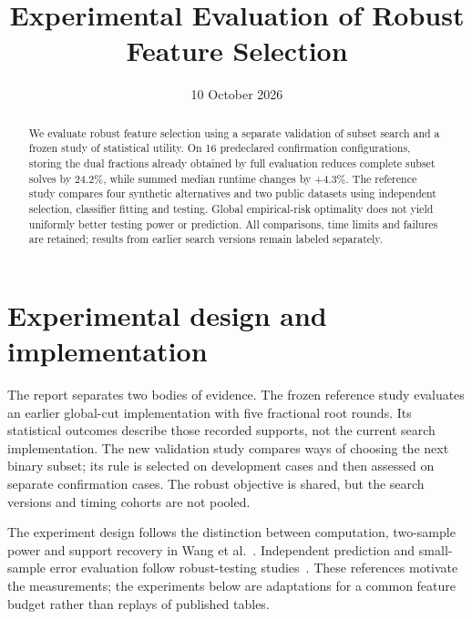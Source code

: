\documentclass[11pt,a4paper]{article}
\title{Experimental Evaluation of Robust Feature Selection}
\author{}
\date{10 October 2026}
\makeatletter
\renewcommand{\maketitle}{\begin{center}{\Large\bfseries\@title\par}\vspace{4pt}
{\small\@date\par}\end{center}\vspace{2pt}}
\makeatother
\begin{document}
\maketitle
\begin{abstract}
We evaluate robust feature selection using a separate validation of subset search and a frozen study of statistical utility. On 16 predeclared confirmation configurations, storing the dual fractions already obtained by full evaluation reduces complete subset solves by 24.2\%, while summed median runtime changes by +4.3\%. The reference study compares four synthetic alternatives and two public datasets using independent selection, classifier fitting and testing. Global empirical-risk optimality does not yield uniformly better testing power or prediction. All comparisons, time limits and failures are retained; results from earlier search versions remain labeled separately.
\end{abstract}

\section{Experimental design and implementation}\label{sec:design}
The report separates two bodies of evidence. The frozen reference study evaluates
an earlier global-cut implementation with five fractional root rounds. Its statistical
outcomes describe those recorded supports, not the current search implementation.
The new validation study compares ways of choosing the next binary subset; its
rule is selected on development cases and then assessed on separate confirmation
cases. The robust objective is shared, but the search versions and timing cohorts
are not pooled.

The experiment design follows the distinction between computation, two-sample
power and support recovery in Wang et al.~\cite{wang}. Independent prediction
and small-sample error evaluation follow robust-testing studies~\cite{xie,sinkhorn,neural}.
These references motivate the measurements; the experiments below are adaptations
for a common feature budget rather than replays of published tables.
\end{document}
